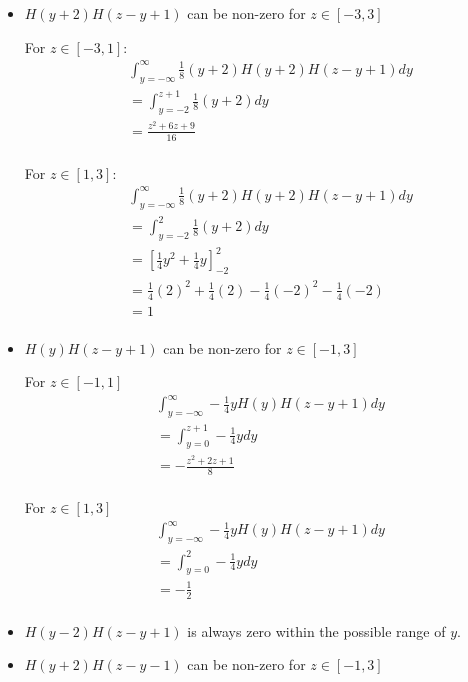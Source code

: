 \begin{itemize}
    \item $H(y+2)H(z-y+1)$ can be non-zero for $z \in [-3,3]$

    For $z \in [-3,1]$:
    \begin{align*}
        &\int_{y =-\infty}^{\infty} \frac{1}{8}(y+2)H(y+2)H(z-y+1) dy \\
        &= \int_{y =-2}^{z+1} \frac{1}{8}(y+2) dy \\
        &= \frac{z^2+6z+9}{16} \\
    \end{align*}

    For $z \in [1,3]$:
    \begin{align*}
        &\int_{y =-\infty}^{\infty} \frac{1}{8}(y+2)H(y+2)H(z-y+1) dy \\
        &= \int_{y =-2}^{2} \frac{1}{8}(y+2) dy \\
        &= \left[\frac{1}{4}y^2+\frac{1}{4}y\right]_{-2}^{2} \\
        &= \frac{1}{4}(2)^2+\frac{1}{4}(2) - \frac{1}{4}(-2)^2-\frac{1}{4}(-2) \\
        &= 1 \\
    \end{align*}

    \item $H(y)H(z-y+1)$ can be non-zero for $z \in [-1,3]$

    For $z \in [-1, 1]$
    \begin{align*}
        &\int_{y =-\infty}^{\infty} - \frac{1}{4}yH(y)H(z-y+1) dy \\
        &= \int_{y=0}^{z+1} -\frac{1}{4}y dy \\
        &= -\frac{z^2+2z+1}{8} \\
    \end{align*}

    For $z \in [1, 3]$
    \begin{align*}
        &\int_{y =-\infty}^{\infty} - \frac{1}{4}yH(y)H(z-y+1) dy \\
        &= \int_{y=0}^{2} -\frac{1}{4}y dy \\
        &= -\frac{1}{2} \\
    \end{align*}

    \item $H(y-2)H(z-y+1)$ is always zero within the possible range of $y$.
    \item $H(y+2)H(z-y-1)$ can be non-zero for $z \in [-1,3]$


\end{itemize}
